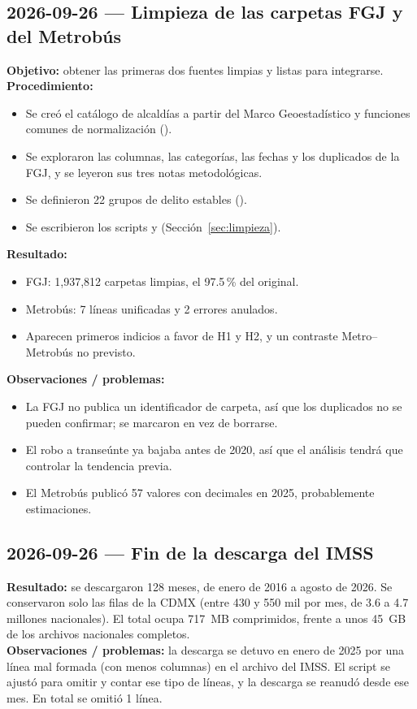 \subsection{2026-09-26 --- Limpieza de las carpetas FGJ y del Metrobús}
\textbf{Objetivo:} obtener las primeras dos fuentes limpias y listas para integrarse.\\
\textbf{Procedimiento:}
\begin{itemize}
  \item Se creó el catálogo de alcaldías a partir del Marco Geoestadístico y funciones comunes de
        normalización ().
  \item Se exploraron las columnas, las categorías, las fechas y los duplicados de la FGJ, y se leyeron
        sus tres notas metodológicas.
  \item Se definieron 22 grupos de delito estables ().
  \item Se escribieron los scripts  y  (Sección~\ref{sec:limpieza}).
\end{itemize}
\textbf{Resultado:}
\begin{itemize}
  \item FGJ: 1,937,812 carpetas limpias, el 97.5\,\% del original.
  \item Metrobús: 7 líneas unificadas y 2 errores anulados.
  \item Aparecen primeros indicios a favor de H1 y H2, y un contraste Metro--Metrobús no previsto.
\end{itemize}
\textbf{Observaciones / problemas:}
\begin{itemize}
  \item La FGJ no publica un identificador de carpeta, así que los duplicados no se pueden confirmar;
        se marcaron en vez de borrarse.
  \item El robo a transeúnte ya bajaba antes de 2020, así que el análisis tendrá que controlar la
        tendencia previa.
  \item El Metrobús publicó 57 valores con decimales en 2025, probablemente estimaciones.
\end{itemize}

\subsection{2026-09-26 --- Fin de la descarga del IMSS}
\textbf{Resultado:} se descargaron 128 meses, de enero de 2016 a agosto de 2026. Se conservaron solo
las filas de la CDMX (entre 430 y 550 mil por mes, de 3.6 a 4.7 millones nacionales). El total
ocupa 717~MB comprimidos, frente a unos 45~GB de los archivos nacionales completos.\\
\textbf{Observaciones / problemas:} la descarga se detuvo en enero de 2025 por una línea mal formada
(con menos columnas) en el archivo del IMSS. El script se ajustó para omitir y contar ese tipo de
líneas, y la descarga se reanudó desde ese mes. En total se omitió 1 línea.

